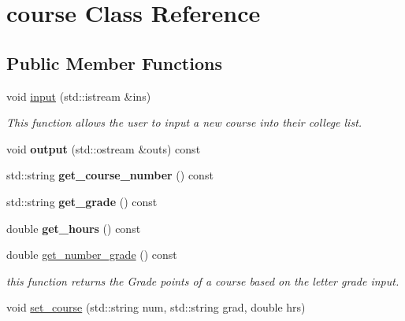 \hypertarget{classcourse}{}\section{course Class Reference}
\label{classcourse}
\subsection*{Public Member Functions}
\begin{DoxyCompactItemize}
\item 
\mbox{\label{classcourse_a0a8839f2369903101399bca60547aed2}} 
void \hyperlink{classcourse_a0a8839f2369903101399bca60547aed2}{input} (std\+::istream \&ins)
\begin{DoxyCompactList}\small\item\em This function allows the user to input a new course into their college list. \end{DoxyCompactList}\item 
\mbox{\label{classcourse_afdd5ccf71bbbb7797b75854f16bf373f}} 
void {\bfseries output} (std\+::ostream \&outs) const
\item 
\mbox{\label{classcourse_a8b2f74ab01eae52d779979887fc3b079}} 
std\+::string {\bfseries get\+\_\+course\+\_\+number} () const
\item 
\mbox{\label{classcourse_a5008b6a7c44047fefa1c7779b771aad4}} 
std\+::string {\bfseries get\+\_\+grade} () const
\item 
\mbox{\label{classcourse_a09f7b2b40cbbb81c94e0642d5b13663e}} 
double {\bfseries get\+\_\+hours} () const
\item 
\mbox{\label{classcourse_aad43a6b7ce264bd4038472fc3e40cf16}} 
double \hyperlink{classcourse_aad43a6b7ce264bd4038472fc3e40cf16}{get\+\_\+number\+\_\+grade} () const
\begin{DoxyCompactList}\small\item\em this function returns the Grade points of a course based on the letter grade input. \end{DoxyCompactList}\item 
void \hyperlink{classcourse_a1fce1a16efb3f07d0da5daca8005e4a6}{set\+\_\+course} (std\+::string num, std\+::string grad, double hrs)

\end{DoxyCompactItemize}
